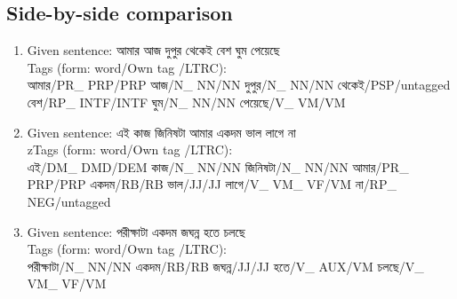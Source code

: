 \documentclass[11pt,a4paper,twocolumn]{article}
\begin{document}
	\subsection{Side-by-side comparison}
	{\bg 
	\begin{enumerate}
		\item Given sentence: 
		\textcolor{diff}{আমার আজ দুপুর থেকেই বেশ ঘুম পেয়েছে}\\
		$ $\\
		Tags (form: word\textcolor{hlit}{/Own tag}
		\textcolor{rlit}{/LTRC}):\\$ $\\
আমার\textcolor{hlit}{/PR\_ PRP}\textcolor{rlit}{/PRP}
আজ\textcolor{hlit}{/N\_ NN}\textcolor{rlit}{/NN}
দুপুর\textcolor{hlit}{/N\_ NN}\textcolor{rlit}{/NN}
থেকেই\textcolor{hlit}{/PSP}\textcolor{rlit}{/untagged}
বেশ\textcolor{hlit}{/RP\_ INTF}\textcolor{rlit}{/INTF}
ঘুম\textcolor{hlit}{/N\_ NN}\textcolor{rlit}{/NN}
পেয়েছে\textcolor{hlit}{/V\_ VM}\textcolor{rlit}{/VM}\\
		$ $\\
		\item Given sentence: \textcolor{diff}{এই কাজ জিনিষটা আমার একদম ভাল লাগে না}\\
		$ $\\
		zTags (form: word\textcolor{hlit}{/Own tag}
		\textcolor{rlit}{/LTRC}):\\$ $\\
এই\textcolor{hlit}{/DM\_ DMD}\textcolor{rlit}{/DEM}
কাজ\textcolor{hlit}{/N\_ NN}\textcolor{rlit}{/NN}
জিনিষটা\textcolor{hlit}{/N\_ NN}\textcolor{rlit}{/NN}
আমার\textcolor{hlit}{/PR\_ PRP}\textcolor{rlit}{/PRP}
একদম\textcolor{hlit}{/RB}\textcolor{rlit}{/RB}
ভাল\textcolor{hlit}{/JJ}\textcolor{rlit}{/JJ}
লাগে\textcolor{hlit}{/V\_ VM\_ VF}\textcolor{rlit}{/VM}
না\textcolor{hlit}{/RP\_ NEG}\textcolor{rlit}{/untagged}\\
		$ $\\
		\item Given sentence: \textcolor{diff}{পরীক্ষাটা একদম জঘন্ন হতে চলছে}\\
		$ $\\
		Tags (form: word\textcolor{hlit}{/Own tag}
		\textcolor{rlit}{/LTRC}):\\$ $\\
পরীক্ষাটা\textcolor{hlit}{/N\_ NN}\textcolor{rlit}{/NN}
একদম\textcolor{hlit}{/RB}\textcolor{rlit}{/RB}
জঘন্ন\textcolor{hlit}{/JJ}\textcolor{rlit}{/JJ}
হতে\textcolor{hlit}{/V\_ AUX}\textcolor{rlit}{/VM}
চলছে\textcolor{hlit}{/V\_ VM\_ VF}\textcolor{rlit}{/VM}\\

\end{enumerate}}
\end{document}
